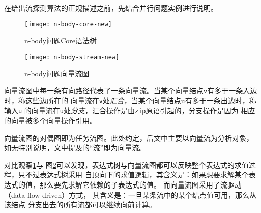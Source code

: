 在给出流探测算法的正规描述之前，先结合并行问题实例进行说明。
\begin{quotation}
\end{quotation}
\begin{figure}
  \centering
  \texttt{[image: n-body-core-new]}
  \caption{n-body问题Core语法树}
  \label{fig:n-body-core}
\end{figure}
\begin{figure}
  \centering
  \texttt{[image: n-body-stream-new]}
  \caption{n-body问题向量流图}
  \label{fig:n-body-stream}
\end{figure}

向量流图中每一条有向路径代表了一条向量流。当某个向量结点\texttt{v}有多于一条入边时，称这些边所在的
向量流在\texttt{v}处\emph{汇合}，当某个向量结点u有多于一条出边时，称输入\texttt{u}
的向量流在\texttt{u}处\emph{分支}，汇合操作是由\texttt{zip}原语引起的，分支操作是因为
相应的向量被多个向量操作引用。

向量流图的对偶图即为任务流图。此处约定，后文中主要以向量流为分析对象，
如无特别说明，文中提及的“流”即为向量流。

对比观察\ref{fig:n-body-core}与
图\ref{fig:n-body-stream}可以发现，表达式树与向量流图都可以反映整个表达式的求值过程，只不过表达式树采用
自顶向下的求值逻辑，其含义是：如果想要求解某个表达式的值，那么要先求解它依赖的子表达式的值。
而向量流图采用了流驱动（data-flow driven）方式，
其含义是：一旦某条流中的某个结点值可用，那么从该结点
分支出去的所有流都可以继续向前计算。


